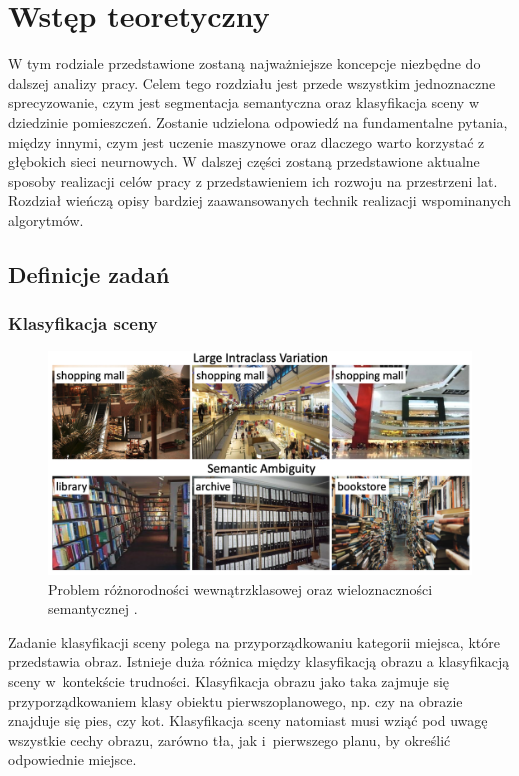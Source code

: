 \newpage %
\section{Wstęp teoretyczny}
W tym rodziale przedstawione zostaną najważniejsze koncepcje niezbędne do dalszej analizy pracy. Celem tego rozdziału jest przede wszystkim jednoznaczne sprecyzowanie, czym jest segmentacja semantyczna oraz klasyfikacja sceny w dziedzinie pomieszczeń. Zostanie udzielona odpowiedź na fundamentalne pytania, między innymi, czym jest uczenie maszynowe oraz dlaczego warto korzystać z głębokich sieci neurnowych. W dalszej części zostaną przedstawione aktualne sposoby realizacji celów pracy z przedstawieniem ich rozwoju na przestrzeni lat. Rozdział wieńczą opisy bardziej zaawansowanych technik realizacji wspominanych algorytmów.
\subsection{Definicje zadań}
\subsubsection{Klasyfikacja sceny}
\begin{figure}[ht!]
    \includegraphics[width=\textwidth]{img/scene_class.png}
    \caption{Problem różnorodności wewnątrzklasowej oraz wieloznaczności semantycznej \cite{zeng2021deep}.}
    \label{fig:scene-class}
\end{figure}

Zadanie klasyfikacji sceny polega na przyporządkowaniu kategorii miejsca, które przedstawia obraz. Istnieje duża różnica między klasyfikacją obrazu a klasyfikacją sceny w~kontekście trudności. Klasyfikacja obrazu jako taka zajmuje się przyporządkowaniem klasy obiektu pierwszoplanowego, np. czy na obrazie znajduje się pies, czy kot. Klasyfikacja sceny natomiast musi wziąć pod uwagę wszystkie cechy obrazu, zarówno tła, jak i~pierwszego planu, by określić odpowiednie miejsce. 

